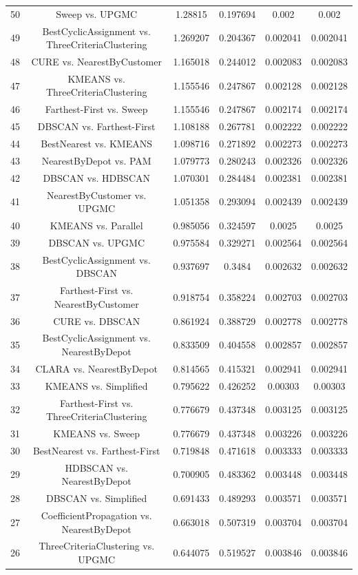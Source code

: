 \documentclass[a4paper,10pt]{article}
\begin{document}
\begin{landscape}
\begin{table}[!htp]
\begin{tabular}{cccccc}
50&Sweep vs. UPGMC&1.28815&0.197694&0.002&0.002\\
49&BestCyclicAssignment vs. ThreeCriteriaClustering&1.269207&0.204367&0.002041&0.002041\\
48&CURE vs. NearestByCustomer&1.165018&0.244012&0.002083&0.002083\\
47&KMEANS vs. ThreeCriteriaClustering&1.155546&0.247867&0.002128&0.002128\\
46&Farthest-First vs. Sweep&1.155546&0.247867&0.002174&0.002174\\
45&DBSCAN vs. Farthest-First&1.108188&0.267781&0.002222&0.002222\\
44&BestNearest vs. KMEANS&1.098716&0.271892&0.002273&0.002273\\
43&NearestByDepot vs. PAM&1.079773&0.280243&0.002326&0.002326\\
42&DBSCAN vs. HDBSCAN&1.070301&0.284484&0.002381&0.002381\\
41&NearestByCustomer vs. UPGMC&1.051358&0.293094&0.002439&0.002439\\
40&KMEANS vs. Parallel&0.985056&0.324597&0.0025&0.0025\\
39&DBSCAN vs. UPGMC&0.975584&0.329271&0.002564&0.002564\\
38&BestCyclicAssignment vs. DBSCAN&0.937697&0.3484&0.002632&0.002632\\
37&Farthest-First vs. NearestByCustomer&0.918754&0.358224&0.002703&0.002703\\
36&CURE vs. DBSCAN&0.861924&0.388729&0.002778&0.002778\\
35&BestCyclicAssignment vs. NearestByDepot&0.833509&0.404558&0.002857&0.002857\\
34&CLARA vs. NearestByDepot&0.814565&0.415321&0.002941&0.002941\\
33&KMEANS vs. Simplified&0.795622&0.426252&0.00303&0.00303\\
32&Farthest-First vs. ThreeCriteriaClustering&0.776679&0.437348&0.003125&0.003125\\
31&KMEANS vs. Sweep&0.776679&0.437348&0.003226&0.003226\\
30&BestNearest vs. Farthest-First&0.719848&0.471618&0.003333&0.003333\\
29&HDBSCAN vs. NearestByDepot&0.700905&0.483362&0.003448&0.003448\\
28&DBSCAN vs. Simplified&0.691433&0.489293&0.003571&0.003571\\
27&CoefficientPropagation vs. NearestByDepot&0.663018&0.507319&0.003704&0.003704\\
26&ThreeCriteriaClustering vs. UPGMC&0.644075&0.519527&0.003846&0.003846\\

\end{tabular}
\end{table}
\end{landscape}
\end{document}
